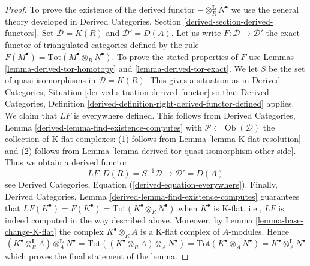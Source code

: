 \documentclass[10pt,a4paper]{amsart}
\theoremstyle{plain}
\theoremstyle{definition}
\theoremstyle{remark}
\numberwithin{equation}{subsection}
\def\Ob{\mathop{\mathrm{Ob}}\nolimits}
\begin{document}
\begin{proof}
To prove the existence of the derived functor
$- \otimes_R^\mathbf{L} N^\bullet$
we use the general theory developed in
Derived Categories, Section \ref{derived-section-derived-functors}.
Set $\mathcal{D} = K(R)$ and $\mathcal{D}' = D(A)$.
Let us write $F : \mathcal{D} \to \mathcal{D}'$ the exact functor
of triangulated categories defined by the rule
$F(M^\bullet) = \text{Tot}(M^\bullet \otimes_R N^\bullet)$.
To prove the stated properties of $F$ use
Lemmas \ref{lemma-derived-tor-homotopy} and \ref{lemma-derived-tor-exact}.
We let $S$ be the set of
quasi-isomorphisms in $\mathcal{D} = K(R)$.
This gives a situation as in
Derived Categories, Situation \ref{derived-situation-derived-functor}
so that
Derived Categories, Definition
\ref{derived-definition-right-derived-functor-defined}
applies. We claim that $LF$ is everywhere defined.
This follows from
Derived Categories, Lemma \ref{derived-lemma-find-existence-computes}
with $\mathcal{P} \subset \Ob(\mathcal{D})$ the collection
of K-flat complexes: (1) follows from
Lemma \ref{lemma-K-flat-resolution}
and (2) follows from
Lemma \ref{lemma-derived-tor-quasi-isomorphism-other-side}.
Thus we obtain a derived functor
$$
LF : D(R) = S^{-1}\mathcal{D} \longrightarrow \mathcal{D}' = D(A)
$$
see
Derived Categories, Equation (\ref{derived-equation-everywhere}).
Finally,
Derived Categories, Lemma \ref{derived-lemma-find-existence-computes}
guarantees that $LF(K^\bullet) = F(K^\bullet) =
\text{Tot}(K^\bullet \otimes_R N^\bullet)$
when $K^\bullet$ is K-flat, i.e., $LF$ is indeed computed in the way
described above. Moreover, by Lemma \ref{lemma-base-change-K-flat}
the complex $K^\bullet \otimes_R A$ is a K-flat complex of $A$-modules.
Hence
$$
(K^\bullet \otimes_R^\mathbf{L} A) \otimes_A^\mathbf{L} N^\bullet =
\text{Tot}((K^\bullet \otimes_R A) \otimes_A N^\bullet) =
\text{Tot}(K^\bullet \otimes_A N^\bullet) =
K^\bullet \otimes_A^\mathbf{L} N^\bullet
$$
which proves the final statement of the lemma.
\end{proof}
\end{document}
